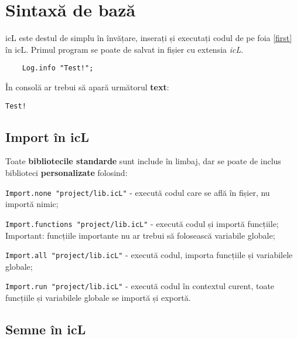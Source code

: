 

\section{Sintaxă de bază}

icL este destul de simplu în învățare, inserați și executați codul de pe foia \ref{first} în icL. Primul program se poate de salvat in fișier cu extensia \textit{icL}.

\begin{sourcecode}
    \label{first}
    \begin{verbatim}
    Log.info "Test!";
    \end{verbatim}
\end{sourcecode}

În consolă ar trebui să apară următorul \textbf{text}:

\begin{verbatim}
Test!
\end{verbatim}

\subsection{Import în icL}

Toate \textbf{bibliotecile standarde} sunt include în limbaj, dar se poate de inclus biblioteci \textbf{personalizate} folosind:

\begin{icItems}
\item
	\texttt{Import.none "project/lib.icL"} - execută codul care se află în fișier, nu importă nimic;
\item
	\texttt{Import.functions "project/lib.icL"} - execută codul și importă funcțiile; {\color{red}Important:} funcțiile importante nu ar trebui să folosească variabile globale;
\item
	\texttt{Import.all "project/lib.icL"} -  execută codul, importa funcțiile și variabilele globale;
\item
	\texttt{Import.run "project/lib.icL"} - execută codul în contextul curent, toate funcțiile și variabilele globale se importă și exportă.
\end{icItems}

\subsection{Semne în icL}

